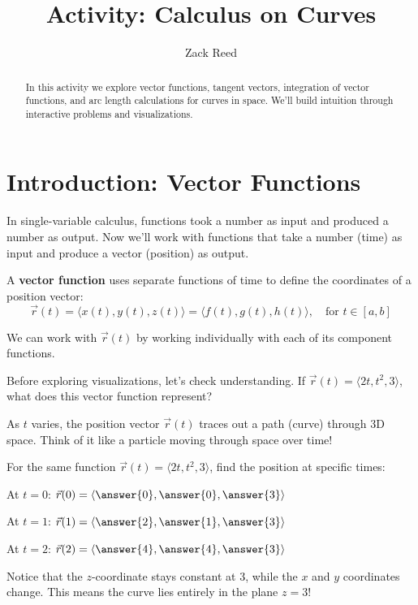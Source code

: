 \documentclass{ximera}
\title{Activity: Calculus on Curves}
\author{Zack Reed}
\begin{document}
\begin{abstract}
In this activity we explore vector functions, tangent vectors, integration of vector functions, and arc length calculations for curves in space. We'll build intuition through interactive problems and visualizations.
\end{abstract}
\maketitle

\section*{Introduction: Vector Functions}

In single-variable calculus, functions took a number as input and produced a number as output. Now we'll work with functions that take a number (time) as input and produce a vector (position) as output.

\begin{definition}
A \textbf{vector function} uses separate functions of time to define the coordinates of a position vector:
$$\vec{r}(t) = \langle x(t), y(t), z(t) \rangle = \langle f(t), g(t), h(t) \rangle, \quad \text{for } t \in [a,b]$$

We can work with $\vec{r}(t)$ by working individually with each of its component functions.
\end{definition}

\begin{problem}
Before exploring visualizations, let's check understanding. If $\vec{r}(t) = \langle 2t, t^2, 3 \rangle$, what does this vector function represent?

\begin{multipleChoice}
\end{multipleChoice}

\begin{feedback}
As $t$ varies, the position vector $\vec{r}(t)$ traces out a path (curve) through 3D space. Think of it like a particle moving through space over time!
\end{feedback}
\end{problem}

\begin{problem}
For the same function $\vec{r}(t) = \langle 2t, t^2, 3 \rangle$, find the position at specific times:

At $t=0$: $\vec{r}(0) = \langle \answer{0}, \answer{0}, \answer{3} \rangle$

At $t=1$: $\vec{r}(1) = \langle \answer{2}, \answer{1}, \answer{3} \rangle$

At $t=2$: $\vec{r}(2) = \langle \answer{4}, \answer{4}, \answer{3} \rangle$

\begin{feedback}
Notice that the $z$-coordinate stays constant at 3, while the $x$ and $y$ coordinates change. This means the curve lies entirely in the plane $z=3$!
\end{feedback}
\end{problem}
\end{document}

